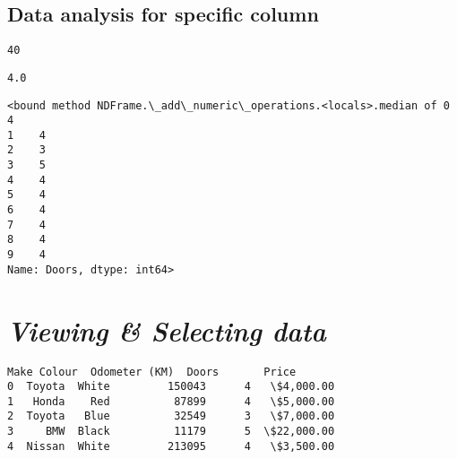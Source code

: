 \documentclass[11pt]{article}
\begin{document}
    \hypertarget{data-analysis-for-specific-column}{%
\subsection{\texorpdfstring{\textbf{Data analysis for specific
column}}{Data analysis for specific column}}\label{data-analysis-for-specific-column}}

            \begin{tcolorbox}[breakable, size=fbox, boxrule=.5pt, pad at break*=1mm, opacityfill=0]
\begin{Verbatim}[commandchars=\\\{\}]
40
\end{Verbatim}
\end{tcolorbox}
        
            \begin{tcolorbox}[breakable, size=fbox, boxrule=.5pt, pad at break*=1mm, opacityfill=0]
\begin{Verbatim}[commandchars=\\\{\}]
4.0
\end{Verbatim}
\end{tcolorbox}
        
            \begin{tcolorbox}[breakable, size=fbox, boxrule=.5pt, pad at break*=1mm, opacityfill=0]
\begin{Verbatim}[commandchars=\\\{\}]
<bound method NDFrame.\_add\_numeric\_operations.<locals>.median of 0    4
1    4
2    3
3    5
4    4
5    4
6    4
7    4
8    4
9    4
Name: Doors, dtype: int64>
\end{Verbatim}
\end{tcolorbox}
        
    \hypertarget{viewing-selecting-data}{%
\section{\texorpdfstring{\textbf{\emph{Viewing \& Selecting
data}}}{Viewing \& Selecting data}}\label{viewing-selecting-data}}

            \begin{tcolorbox}[breakable, size=fbox, boxrule=.5pt, pad at break*=1mm, opacityfill=0]
\begin{Verbatim}[commandchars=\\\{\}]
     Make Colour  Odometer (KM)  Doors       Price
0  Toyota  White         150043      4   \$4,000.00
1   Honda    Red          87899      4   \$5,000.00
2  Toyota   Blue          32549      3   \$7,000.00
3     BMW  Black          11179      5  \$22,000.00
4  Nissan  White         213095      4   \$3,500.00
\end{Verbatim}
\end{tcolorbox}
        
\end{document}

